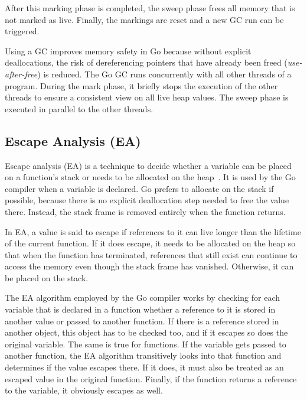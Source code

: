 After this marking phase is completed, the sweep phase frees all memory that is not marked as live.
Finally, the markings are reset and a new \acrshort{GC} run can be triggered.

Using a \acrshort{GC} improves memory safety in Go because without explicit deallocations, the risk of dereferencing
pointers that have already been freed (\textit{use-after-free}) is reduced.
The Go GC runs concurrently with all other threads of a program.
During the mark phase, it briefly stops the execution of the other threads to ensure a consistent view on all live
heap values.
The sweep phase is executed in parallel to the other threads.



\subsection{Escape Analysis (EA)}\label{subsec:background:memory:ea}

Escape analysis (\acrshort{EA}) is a technique to decide whether a variable can be placed on a function's stack or needs
to be allocated on the heap~\cite{choi1999}.
It is used by the Go compiler when a variable is declared.
Go prefers to allocate on the stack if possible, because there is no explicit deallocation step needed to free the value
there.
Instead, the stack frame is removed entirely when the function returns.

In \acrshort{EA}, a value is said to escape if references to it can live longer than the lifetime of the current
function.
If it does escape, it needs to be allocated on the heap so that when the function has terminated, references that
still exist can continue to access the memory even though the stack frame has vanished.
Otherwise, it can be placed on the stack.

The \acrshort{EA} algorithm employed by the Go compiler works by checking for each variable that is declared in a
function whether a reference to it is stored in another value or passed to another function.
If there is a reference stored in another object, this object has to be checked too, and if it escapes so does the
original variable.
The same is true for functions.
If the variable gets passed to another function, the \acrshort{EA} algorithm transitively looks into that function
and determines if the value escapes there.
If it does, it must also be treated as an escaped value in the original function.
Finally, if the function returns a reference to the variable, it obviously escapes as well.


